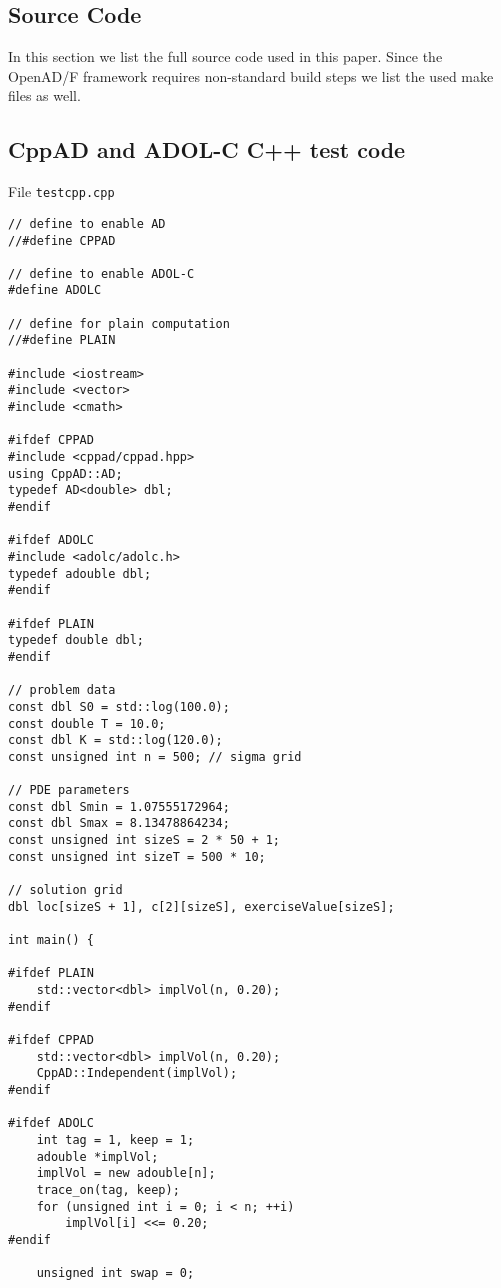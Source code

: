 \documentclass{amsart}
\theoremstyle{plain}
\numberwithin{equation}{section}
\begin{document}
\begin{appendix}

\section{Source Code}

In this section we list the full source code used in this paper. Since the OpenAD/F framework requires non-standard build steps we list the used make files as well.

\subsection{CppAD and ADOL-C C++ test code}

File \verb+testcpp.cpp+

\begin{verbatim}
// define to enable AD
//#define CPPAD

// define to enable ADOL-C
#define ADOLC

// define for plain computation
//#define PLAIN

#include <iostream>
#include <vector>
#include <cmath>

#ifdef CPPAD
#include <cppad/cppad.hpp>
using CppAD::AD;
typedef AD<double> dbl;
#endif

#ifdef ADOLC
#include <adolc/adolc.h>
typedef adouble dbl;
#endif

#ifdef PLAIN
typedef double dbl;
#endif

// problem data
const dbl S0 = std::log(100.0);
const double T = 10.0;
const dbl K = std::log(120.0);
const unsigned int n = 500; // sigma grid

// PDE parameters
const dbl Smin = 1.07555172964;
const dbl Smax = 8.13478864234;
const unsigned int sizeS = 2 * 50 + 1;
const unsigned int sizeT = 500 * 10;

// solution grid
dbl loc[sizeS + 1], c[2][sizeS], exerciseValue[sizeS];

int main() {

#ifdef PLAIN
    std::vector<dbl> implVol(n, 0.20);
#endif

#ifdef CPPAD
    std::vector<dbl> implVol(n, 0.20);
    CppAD::Independent(implVol);
#endif

#ifdef ADOLC
    int tag = 1, keep = 1;
    adouble *implVol;
    implVol = new adouble[n];
    trace_on(tag, keep);
    for (unsigned int i = 0; i < n; ++i)
        implVol[i] <<= 0.20;
#endif

    unsigned int swap = 0;


\end{verbatim}
\end{appendix}
\end{document}
